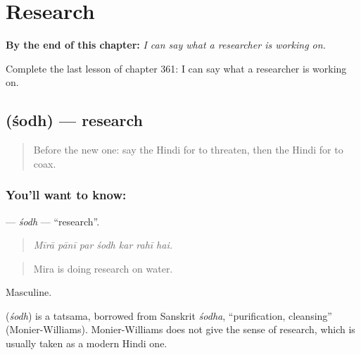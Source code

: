 
\chapter{Research}
\label{ch:hi-research}

\begin{chapteropening}
\textbf{By the end of this chapter:} \emph{I can say what a researcher is working on.}

Complete the last lesson of chapter 361: I can say what a researcher is working on.
\end{chapteropening}

\section[\texorpdfstring{\hi{शोध} (śodh)}{शोध (śodh)}]{ (śodh) — research}

\label{lesson:HI-C361-sodh}



\begin{quote}
Before the new one: say the Hindi for to threaten, then the Hindi for to coax.
\end{quote}

\subsection*{You'll want to know: }
\textbf{} — \emph{śodh} — \textquotedblleft{}research\textquotedblright{}.

\begin{quote}
      
\end{quote}

\begin{quote}
\emph{Mīrā pānī par śodh kar rahī hai.}
\end{quote}

\begin{quote}
Mira is doing research on water.
\end{quote}

Masculine.

\begin{cousinweb}
\textbf{} (\emph{śodh}) is a tatsama, borrowed from Sanskrit \emph{śodha}, \textquotedblleft{}purification, cleansing\textquotedblright{} (Monier-Williams). Monier-Williams does not give the sense of research, which is usually taken as a modern Hindi one.
\end{cousinweb}

